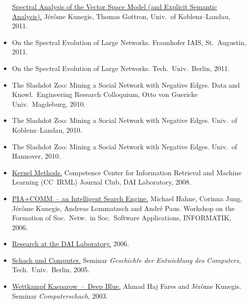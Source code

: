 \documentclass[line,mm]{res}
\newcounter{x}
\newcounter{y}
\newcommand{\talknumber}{T\arabic{y}\stepcounter{y}}
\begin{document}
\begin{resume}
\begin{itemize}
    \href{https://github.com/kunegis/pdfs/blob/master/kunegis:explicit-diagonality.presentation.pdf}{Spectral
      Analysis of the Vector Space Model (and Explicit Semantic Analysis).}
    Jérôme Kunegis, Thomas Gottron, Univ.\ of Koblenz--Landau, 2011. 
  \item[{[\talknumber]}] On the Spectral Evolution of Large Networks.  Fraunhofer IAIS,
    St.\ Augustin, 2011.  
  \item[{[\talknumber]}] On the Spectral Evolution of Large Networks. Tech.\ Univ.\ Berlin, 2011.  
  \item[{[\talknumber]}] The Slashdot Zoo: Mining a Social Network with Negative
    Edges. Data and Knowl.\ Engineering Research Colloquium,
    Otto von Guericke Univ.\ Magdeburg, 2010.  
  \item[{[\talknumber]}] The Slashdot Zoo: Mining a Social Network with Negative
    Edges. Univ.\ of Koblenz--Landau, 2010. 
  \item[{[\talknumber]}] The Slashdot Zoo: Mining a Social Network with Negative
    Edges. Univ.\ of Hannover, 2010. 
  \item[{[\talknumber]}]
    \href{https://github.com/kunegis/pdfs/blob/master/kunegis:kernels-club.presentation.pdf}{Kernel Methods.}
    Competence Center for Information Retrieval and Machine Learning (CC~IRML) Journal Club, DAI Laboratory, 2008. 
  \item[{[\talknumber]}] 
    \href{https://github.com/kunegis/pdfs/blob/master/hahne:gradualisiertes-communitymodell.presentation.pdf}{PIA+COMM~--
      an Intelligent Search Engine.} 
    Michael Hahne, Corinna Jung, Jérôme Kunegis, Andreas Lommatzsch and
    André Paus. 
    Workshop on the Formation of Soc.\ Netw.\ in Soc.\ Software
    Applications, INFORMATIK, 2006. 
  \item[{[\talknumber]}]
    \href{https://github.com/kunegis/pdfs/blob/master/kunegis:research-dai.presentation.pdf}{Research at the DAI Laboratory.}
    2006.
  \item[{[\talknumber]}]
    \href{https://www.slideshare.net/kunegis/schach-und-computer}{Schach und Computer.}
    Seminar \emph{Geschichte der Entwicklung des Computers}, Tech.\ Univ.\ Berlin, 2005.
  \item[{[\talknumber]}]
    \href{https://github.com/kunegis/pdfs/blob/master/kunegis:kasparow-deep-blue.presentation.pdf}{Wettkampf Kasparow~--\ Deep Blue.}
    Ahmad Haj Fares and Jérôme Kunegis.
    Seminar \emph{Computerschach}, 2003. 
\end{itemize}


\end{resume}
\end{document}

